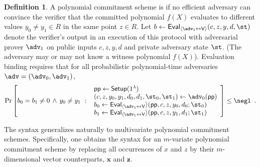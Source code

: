 \documentclass{article}
\theoremstyle{definition}
\newtheorem{definition}{Definition}
\newcommand{\alaninline}[1]{{\todo[color=blue!20!white, inline]{Alan: #1}}}
\newcommand{\alaninline}[1]{}
\begin{document}
\begin{definition}
A polynomial commitment scheme is  if no efficient adversary can convince the verifier that the committed polynomial $f(X)$ evaluates to different values $y_0 \neq y_1 \in R$ in the same point $z \in R$. Let $b \gets \pro{Eval}_{\langle \adv_1 \leftrightarrow \mathsf{V}\rangle}(c, z, y, d, \st)$ denote the verifier's output in an execution of this protocol with adversarial prover $\adv_1$ on public inputs $c, z, y, d$ and private adversary state $\st$. (The adversary may or may not know a witness polynomial $f(X)$). Evaluation binding requires that for all probabilistic polynomial-time adversaries $\adv = (\adv_0, \adv_1)$,
\[
    \Pr\left[
         b_0 = b_1 \neq 0 \, \wedge \, y_0 \neq y_1 \ 
         : \
       \begin{array}{l}
            \params \gets \pro{Setup}(1^\lambda) \\
            (c, z, y_0, y_1, d_0, d_1, \st_0, \st_1) \gets \adv_0(\params) \\
            b_0 \gets \pro{Eval}_{\langle \adv_1 \leftrightarrow \mathsf{V}} \rangle(\params, c, z, y_0, d_0; \st_0) \\
            b_1 \gets \pro{Eval}_{\langle \adv_1 \leftrightarrow \mathsf{V}} \rangle(\params, c, z, y_1, d_1; \st_1) \\
        \end{array}
    \right] \leq \negl \enspace .
\]
\end{definition}

The syntax generalizes naturally to multivariate polynomial commitment schemes. Specifically, one obtains the syntax for an $m$-variate polynomial commitment scheme by replacing all occurrences of $x$ and $z$ by their $m$-dimensional vector counterparts, $\mathbf{x}$ and $\mathbf{z}$.



\end{document}

